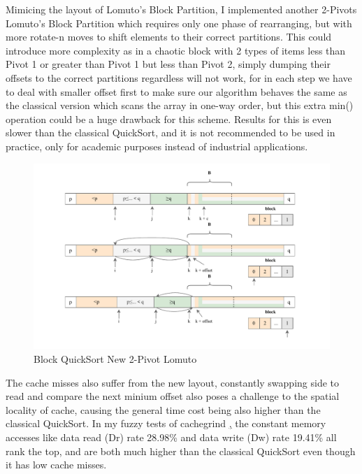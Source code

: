 \documentclass[a4paper,oneside,12pt]{book}
\begin{document}
Mimicing the layout of Lomuto's Block Partition, I implemented another 2-Pivots Lomuto's Block Partition which requires only one phase of rearranging, but with more rotate-n moves to shift elements to their correct partitions. This could introduce more complexity as in a chaotic block with 2 types of items less than Pivot 1 or greater than Pivot 1 but less than Pivot 2,
simply dumping their offsets to the correct partitions regardless will not work, for in each step we have to deal with smaller offset first to make sure our algorithm behaves the same as the classical version which scans the array in one-way order, but this extra min() operation could be a huge drawback for this scheme.
Results for this is even slower than the classical QuickSort, and it is not recommended to be used in practice, only for academic purposes instead of industrial applications.
\begin{figure}[H]
    \hypertarget{fig:newblock}{}
    \caption{Block QuickSort New 2-Pivot Lomuto}
    \centering
    \hspace*{-0.27\textwidth}
    \includegraphics[width=1.5\textwidth]{new_lomuto_block.drawio.pdf}
\end{figure}
The cache misses also suffer from the new layout, constantly swapping side to read and compare the next minium offset also poses a challenge to the spatial locality of cache,
causing the general time cost being also higher than the classical QuickSort. In my fuzzy tests of cachegrind \hyperlink{cachegrindresult}, \hypertarget{SlowMemAccess}{}the constant memory accesses like data read (Dr) rate 28.98\% and data write (Dw) rate 19.41\% all rank the top, and are both much higher than the classical QuickSort even though it has low cache misses.
\end{document}
